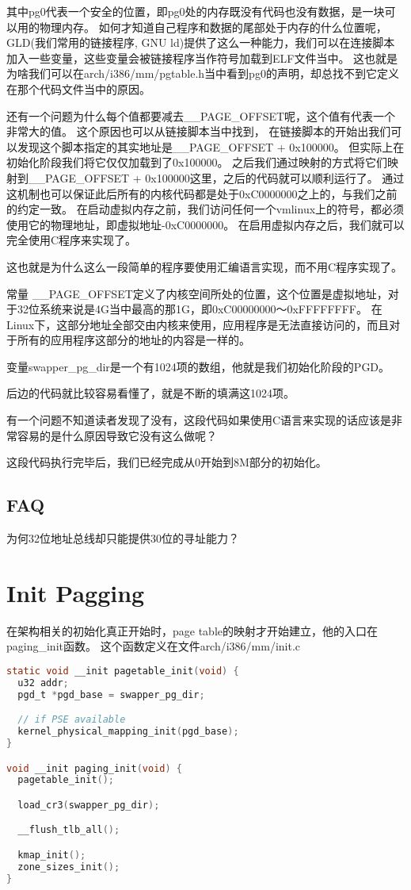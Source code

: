其中pg0代表一个安全的位置，即pg0处的内存既没有代码也没有数据，是一块可以用的物理内存。
如何才知道自己程序和数据的尾部处于内存的什么位置呢， GLD(我们常用的链接程序, GNU ld)提供了这么一种能力，我们可以在连接脚本加入一些变量，这些变量会被链接程序当作符号加载到ELF文件当中。
这也就是为啥我们可以在arch/i386/mm/pgtable.h当中看到pg0的声明，却总找不到它定义在那个代码文件当中的原因。

还有一个问题为什么每个值都要减去\_\_PAGE\_OFFSET呢，这个值有代表一个非常大的值。
这个原因也可以从链接脚本当中找到， 在链接脚本的开始出我们可以发现这个脚本指定的其实地址是\_\_PAGE\_OFFSET + 0x100000。
但实际上在初始化阶段我们将它仅仅加载到了0x100000。
之后我们通过映射的方式将它们映射到\_\_PAGE\_OFFSET + 0x100000这里，之后的代码就可以顺利运行了。
通过这机制也可以保证此后所有的内核代码都是处于0xC0000000之上的，与我们之前的约定一致。
在启动虚拟内存之前，我们访问任何一个vmlinux上的符号，都必须使用它的物理地址，即虚拟地址-0xC0000000。
在启用虚拟内存之后，我们就可以完全使用C程序来实现了。

这也就是为什么这么一段简单的程序要使用汇编语言实现，而不用C程序实现了。

常量 \_\_PAGE\_OFFSET定义了内核空间所处的位置，这个位置是虚拟地址，对于32位系统来说是4G当中最高的那1G，即0xC00000000～0xFFFFFFFF。
在Linux下，这部分地址全部交由内核来使用，应用程序是无法直接访问的，而且对于所有的应用程序这部分的地址的内容是一样的。

变量swapper\_pg\_dir是一个有1024项的数组，他就是我们初始化阶段的PGD。

后边的代码就比较容易看懂了，就是不断的填满这1024项。


有一个问题不知道读者发现了没有，这段代码如果使用C语言来实现的话应该是非常容易的是什么原因导致它没有这么做呢？

这段代码执行完毕后，我们已经完成从0开始到8M部分的初始化。

\subsection{FAQ}
为何32位地址总线却只能提供30位的寻址能力？

\section{Init Pagging}

在架构相关的初始化真正开始时，page table的映射才开始建立，他的入口在paging\_init函数。
这个函数定义在文件arch/i386/mm/init.c
\begin{lstlisting}[language=C]
static void __init pagetable_init(void) {
  u32 addr;
  pgd_t *pgd_base = swapper_pg_dir;

  // if PSE available
  kernel_physical_mapping_init(pgd_base);
}

void __init paging_init(void) {
  pagetable_init();

  load_cr3(swapper_pg_dir);

  __flush_tlb_all();

  kmap_init();
  zone_sizes_init();
}
\end{lstlisting}


